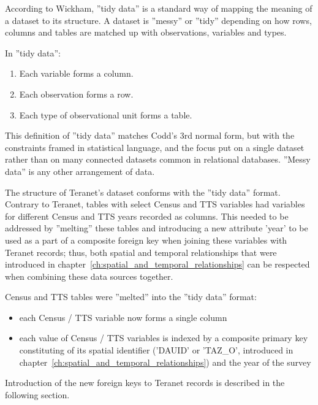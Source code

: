 According to Wickham\cite{Wickham2014}, ''tidy data'' is a standard way of mapping the meaning of a dataset to its structure.
A dataset is ''messy'' or ''tidy'' depending on how rows, columns and tables are matched up with observations, variables and types.

\vspace{5mm}

In ''tidy data'':
\begin{enumerate}
    \item Each variable forms a column.
    \item Each observation forms a row.
    \item Each type of observational unit forms a table.
\end{enumerate}

This definition of ''tidy data'' matches Codd's 3rd normal form\cite{Codd1990}, but with the constraints framed in statistical language, and the focus put on a single dataset rather than on many connected datasets common in relational databases.
''Messy data'' is any other arrangement of data.

\vspace{5mm}

The structure of Teranet's dataset conforms with the ''tidy data'' format.
Contrary to Teranet, tables with select Census and TTS variables had variables for different Census and TTS years recorded as columns.
This needed to be addressed by ''melting'' these tables and introducing a new attribute 'year' to be used as a part of a composite foreign key when joining these variables with Teranet records;
thus, both spatial and temporal relationships that were introduced in chapter~\ref{ch:spatial_and_temporal_relationships} can be respected when combining these data sources together.

\vspace{5mm}

Census and TTS tables were ''melted'' into the ''tidy data'' format:
\begin{itemize}
    \item each Census / TTS variable now forms a single column
    \item each value of Census / TTS variables is indexed by a composite primary key constituting of its spatial identifier ('DAUID' or 'TAZ\_O', introduced in chapter~\ref{ch:spatial_and_temporal_relationships}) and the year of the survey
\end{itemize}

Introduction of the new foreign keys to Teranet records is described in the following section.

